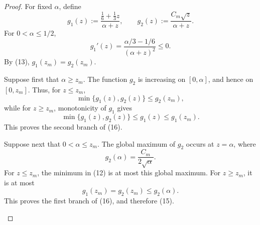 \documentclass[11pt]{article}
\begin{document}
\begin{proof}
For fixed \(\alpha\), define
\[
 g_1(z):=\frac{\frac16+\frac13z}{\alpha+z},
 \qquad
 g_2(z):=\frac{C_m\sqrt z}{\alpha+z}.
\]
For \(0<\alpha\le1/2\),
\[
 g_1'(z)=\frac{\alpha/3-1/6}{(\alpha+z)^2}\le0.
\]
By (13), \(g_1(z_m)=g_2(z_m)\).

Suppose first that \(\alpha\ge z_m\).  The function \(g_2\) is increasing
on \([0,\alpha]\), and hence on \([0,z_m]\).  Thus, for \(z\le z_m\),
\[
 \min\{g_1(z),g_2(z)\}\le g_2(z_m),
\]
while for \(z\ge z_m\), monotonicity of \(g_1\) gives
\[
 \min\{g_1(z),g_2(z)\}\le g_1(z)\le g_1(z_m).
\]
This proves the second branch of (16).

Suppose next that \(0<\alpha\le z_m\).  The global maximum of \(g_2\) occurs
at \(z=\alpha\), where
\[
 g_2(\alpha)=\frac{C_m}{2\sqrt\alpha}.
\]
For \(z\le z_m\), the minimum in (12) is at most this global maximum.  For
\(z\ge z_m\), it is at most
\[
 g_1(z_m)=g_2(z_m)\le g_2(\alpha).
\]
This proves the first branch of (16), and therefore (15).

\begin{figure}[ht]
\centering
\begin{minipage}{0.48\textwidth}
\centering
{}
\end{minipage}
\end{figure}
\end{proof}
\end{document}
